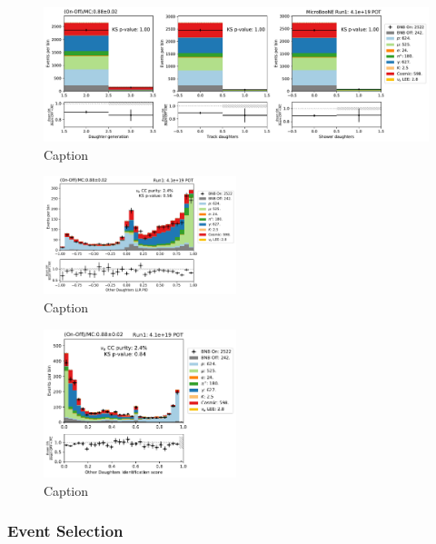 \begin{figure}
    \centering
    \includegraphics[width=\textwidth]{NueCCsel/Images/run1/pre_daughter_2.pdf}
    \caption{Caption}
    \label{fig:pre_daughter_2}
\end{figure}

\begin{figure}
    \centering
    \includegraphics[width=0.5\textwidth]{NueCCsel/Images/run1/pre_daughter_pid.pdf}
    \caption{Caption}
    \label{fig:pre_daughter_pid}
\end{figure}

\begin{figure}
    \centering
    \includegraphics[width=0.5\textwidth]{NueCCsel/Images/run1/pre_daughter_score.pdf}
    \caption{Caption}
    \label{fig:pre_daughter_score}
\end{figure}

\subsubsection{Event Selection}

